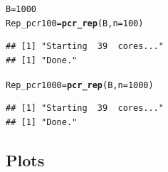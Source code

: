 \documentclass[11pt]{article}\usepackage[]{graphicx}\usepackage[]{color}
\makeatletter
\newcommand{\hlnum}[1]{\textcolor[rgb]{0.686,0.059,0.569}{#1}}%
\newcommand{\hlstd}[1]{\textcolor[rgb]{0.345,0.345,0.345}{#1}}%
\newcommand{\hlkwb}[1]{\textcolor[rgb]{0.69,0.353,0.396}{#1}}%
\newcommand{\hlkwc}[1]{\textcolor[rgb]{0.333,0.667,0.333}{#1}}%
\newcommand{\hlkwd}[1]{\textcolor[rgb]{0.737,0.353,0.396}{\textbf{#1}}}%
\newenvironment{kframe}{%
 \def\at@end@of@kframe{}%
 \ifinner\ifhmode%
  \def\at@end@of@kframe{\end{minipage}}%
  \begin{minipage}{\columnwidth}%
 \fi\fi%
 \def\FrameCommand##1{\hskip\@totalleftmargin \hskip-\fboxsep
 \colorbox{shadecolor}{##1}\hskip-\fboxsep
     \hskip-\linewidth \hskip-\@totalleftmargin \hskip\columnwidth}%
 \MakeFramed {\advance\hsize-\width
   \@totalleftmargin\z@ \linewidth\hsize
   \@setminipage}}%
 {\par\unskip\endMakeFramed%
 \at@end@of@kframe}
\newenvironment{knitrout}{}{} %
\makeatother
\begin{document}
\begin{knitrout}
\begin{kframe}
\begin{alltt}
\hlstd{B} \hlkwb{=} \hlnum{1000}
\hlstd{Rep_pcr100} \hlkwb{=} \hlkwd{pcr_rep}\hlstd{(B,}\hlkwc{n}\hlstd{=}\hlnum{100}\hlstd{)}
\end{alltt}
\begin{verbatim}
## [1] "Starting  39  cores..."
## [1] "Done."
\end{verbatim}
\begin{alltt}
\hlstd{Rep_pcr1000} \hlkwb{=} \hlkwd{pcr_rep}\hlstd{(B,}\hlkwc{n}\hlstd{=}\hlnum{1000}\hlstd{)}
\end{alltt}
\begin{verbatim}
## [1] "Starting  39  cores..."
## [1] "Done."
\end{verbatim}
\end{kframe}
\end{knitrout}
\subsection{Plots}
\end{document}
